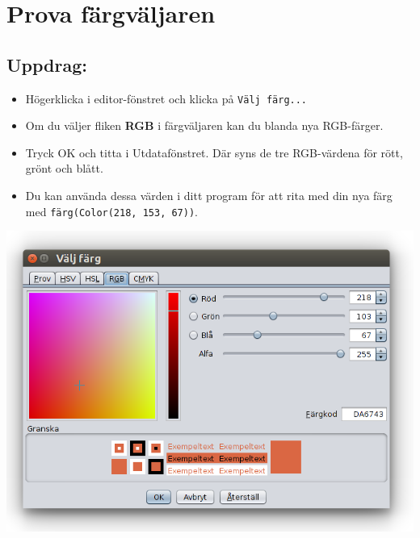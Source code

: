 \chapter{Prova färgväljaren}
\begin{multicols}{2}
\section*{\color{BrickRed}Uppdrag:}


\begin{itemize}

\item {Högerklicka i editor-fönstret och klicka på \lstinline{Välj färg...}}
\item {Om du väljer fliken {\bf RGB} i färgväljaren kan du blanda nya RGB-färger.}
\item {Tryck OK och titta i Utdatafönstret. Där syns de tre RGB-värdena för rött, grönt och blått.}
\item {Du kan använda dessa värden i ditt program för att rita med din nya färg med \lstinline{färg(Color(218, 153, 67))}.}

\end{itemize}



\columnbreak

\begin{center}
\includegraphics[width=14.0cm]{../img/color-chooser-rgb-sv.png}
\end{center}

\end{multicols}

